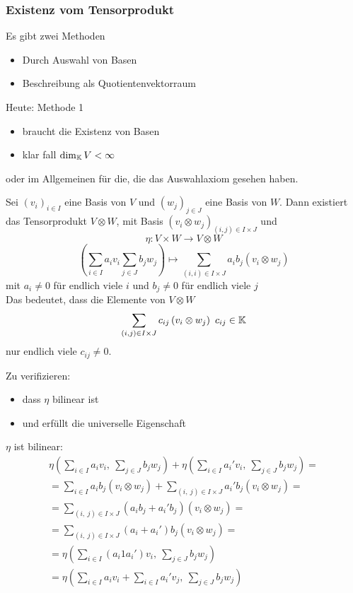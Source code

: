 \subsubsection{Existenz vom Tensorprodukt}
\begin{Bem}
  Es gibt zwei Methoden
  \begin{itemize}
    \item Durch Auswahl von Basen
    \item Beschreibung als Quotientenvektorraum
  \end{itemize}
  Heute: Methode 1
  \begin{itemize}
    \item braucht die Existenz von Basen
    \item klar fall $\dim_{\mathbb{K}} V< \infty$
  \end{itemize}
  oder im Allgemeinen für die, die das Auswahlaxiom gesehen haben.
\end{Bem}
\begin{Prop}
  Sei $(v_i)_{i\in I}$ eine Basis von $V$ und $(w_j)_{j\in J}$ eine Basis von $W$. Dann existiert das Tensorprodukt $V\otimes W$, mit Basis $(v_i\otimes w_j)_{(i,j)\in I\times J}$ und 
  \[\eta:V\times W\to V \otimes W\]
  \[\left( \sum_{i\in I}a_iv_i \sum_{j\in J}b_jw_j \right)\mapsto \sum_{(i,i)\in I\times J}a_ib_j\left( v_i\otimes w_j \right)\]
  mit $a_i\neq 0$ für endlich viele $i$ und $b_j\neq 0$ für endlich viele $j$\\
  Das bedeutet, dass die Elemente von $V\otimes W$
  \[\sum_{(i,j)\in I\times J}c_{ij}\left( v_i\otimes w_j \right)\ c_{ij}\in\mathbb{K}\]
  nur endlich viele $c_{ij}\neq 0$.
\end{Prop}
\begin{Bew}
  Zu verifizieren:
  \begin{itemize}
    \item dass $\eta$ bilinear ist
    \item und erfüllt die universelle Eigenschaft
  \end{itemize}
  $\eta$ ist bilinear:
  \begin{gather*}
    \eta\left( \sum_{i\in I} a_iv_i,\ \sum_{j\in J} b_jw_j \right)+\eta\left( \sum_{i\in I}a_i'v_i,\ \sum_{j\in J} b_jw_j \right)=\\
    =\sum_{i\in I} a_ib_j\left( v_i\otimes w_j \right)+\sum_{\left( i,\ j \right)\in I\times J}a_i'b_j\left( v_i\otimes w_j \right)=\\
    =\sum_{\left( i,\ j \right)\in I\times J}\left( a_ib_j+a_i'b_j \right)\left( v_i\otimes w_j \right)=\\
    =\sum_{\left( i,\ j \right)\in I\times J}\left( a_i+a_i' \right)b_j\left( v_i\otimes w_j \right)=\\
    =\eta\left( \sum_{i\in I}(a_i1a_i')v_i,\ \sum_{j\in J}b_jw_j \right)\\
    =\eta\left( \sum_{i\in I}a_iv_i+\sum_{i\in I}a_i'v_j,\ \sum_{j\in J}b_jw_j \right)
  \end{gather*}
\end{Bew}
